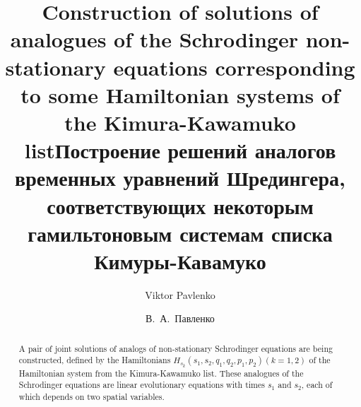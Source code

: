 \begin{englishtitle} %
\title{Construction of solutions of analogues of the Schrodinger non-stationary equations corresponding to some Hamiltonian systems of the Kimura-Kawamuko list}
\author{Viktor Pavlenko}

\maketitle

\begin{abstract}
A pair of joint solutions of analogs of non-stationary Schrodinger equations are being constructed, 
defined by the Hamiltonians $H_{s_k}(s_1,s_2,q_1,q_2,p_1,p_2) (k=1,2)$ of the Hamiltonian system from the Kimura-Kawamuko list.
These analogues of the Schrodinger equations are linear evolutionary equations with times $s_1$ and $s_2$,
each of which depends on two spatial variables.

\end{abstract}
\end{englishtitle}

\iffalse
\documentclass[12pt]{llncs}


\usepackage{iftex}

\ifPDFTeX
\usepackage[T2A]{fontenc}
\usepackage[utf8]{inputenc} %
\usepackage[english,russian]{babel}
\fi

\usepackage{todonotes}

\usepackage[russian]{nla}



\fi

\title{Построение решений аналогов временных уравнений Шредингера, соответствующих некоторым гамильтоновым системам списка Кимуры-Кавамуко
}
\author{В.~А.~Павленко   %
} %

